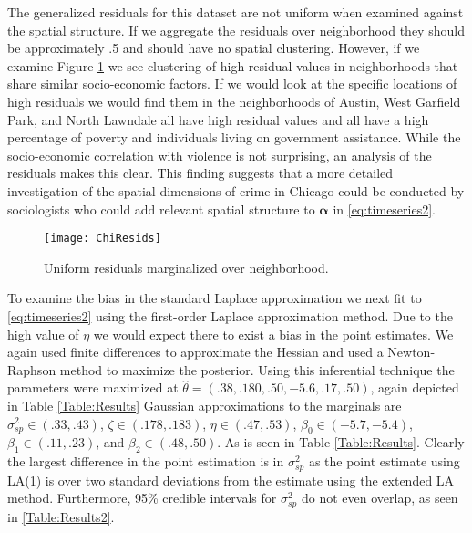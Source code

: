 \documentclass[11pt]{isuthesis}
\begin{document}
	The generalized residuals for this dataset are not uniform when examined against the spatial structure.  If we aggregate the residuals over neighborhood they should be approximately .5 and should have no spatial clustering.  However, if we examine Figure \ref{fig:resids} we see clustering of high residual values in neighborhoods that share similar socio-economic factors.  If we would look at the specific locations of high residuals we would find them in the neighborhoods of Austin, West Garfield Park, and North Lawndale all have high residual values and all have a high percentage of poverty and individuals living on government assistance.  While the socio-economic correlation with violence is not surprising, an analysis of the residuals makes this clear.  This finding suggests that a more detailed investigation of the spatial dimensions of crime in Chicago could be conducted by sociologists who could add relevant spatial structure to $\boldsymbol{\alpha}$ in \eqref{eq:timeseries2}.
	
	
	\begin{figure}[!htp]
		\centering
		\texttt{[image: ChiResids]}
		\caption{Uniform residuals marginalized over neighborhood.}\label{fig:resids}
	\end{figure}
	
	To examine the bias in the standard Laplace approximation we next fit to \eqref{eq:timeseries2} using the first-order Laplace approximation method.  Due to the high value of $\eta$ we would expect there to exist a bias in the point estimates.  We again used finite differences to approximate the Hessian and used a Newton-Raphson method to maximize the posterior.  Using this inferential technique the parameters were maximized at $\hat{\theta}=(.38,.180,.50,-5.6,.17,.50)$, again depicted in Table \ref{Table:Results}  Gaussian approximations to the marginals are $\sigma_{sp}^2 \in (.33,.43)$, $\zeta \in (.178,.183)$, $\eta \in (.47,.53)$, $\beta_0 \in (-5.7,-5.4)$, $\beta_1 \in (.11,.23)$, and $\beta_2 \in (.48,.50)$.  As is seen in Table \ref{Table:Results}.  Clearly the largest difference in the point estimation is in $\sigma_{sp}^2$ as the point estimate using LA(1) is over two standard deviations from the estimate using the extended LA method.  Furthermore, 95\% credible intervals for $\sigma_{sp}^2$ do not even overlap, as seen in \ref{Table:Results2}.
	
\end{document}
